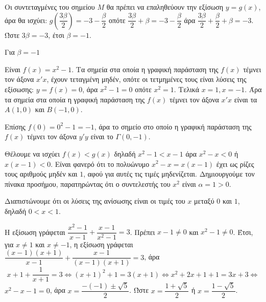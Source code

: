 
\begin{alist}
\item Οι συντεταγμένες του σημείου $M$ θα πρέπει να επαληθεύουν την εξίσωση $y = g(x)$, άρα θα ισχύει:
$g\left(\dfrac{3\beta}{2}\right) = -3 - \dfrac{\beta}{2}$ οπότε $\dfrac{3\beta}{2} + \beta = -3 - \dfrac{\beta}{2}$ άρα $\dfrac{3\beta}{2} + \dfrac{\beta}{2} + \beta = -3$.
Ώστε $3\beta = -3$, έτσι $\beta = -1$.

\item Για $\beta = -1$
\begin{rlist}
\item Είναι $f(x) = x^2 - 1$. Τα σημεία στα οποία η γραφική παράσταση της $f(x)$ τέμνει τον άξονα $x'x$, έχουν τεταγμένη μηδέν, οπότε οι τετμημένες τους είναι λύσεις της εξίσωσης:
$y = f(x) = 0$, άρα $x^2 - 1 = 0$ οπότε $x^2 = 1$. Τελικά $x = 1, x = -1$.
Άρα τα σημεία στα οποία η γραφική παράσταση της $f(x)$ τέμνει τον άξονα $x'x$ είναι τα $A(1, 0)$ και $B(-1, 0)$.

Επίσης $f(0) = 0^2 - 1 = -1$, άρα το σημείο στο οποίο η γραφική παράσταση της $f(x)$ τέμνει τον άξονα $y'y$ είναι το $\Gamma(0, -1)$.

\item Θέλουμε να ισχύει $f(x) < g(x)$ δηλαδή $x^2 - 1 < x - 1$ άρα $x^2 - x < 0$ ή $x(x - 1) < 0$.
Είναι φανερό ότι το πολυώνυμο $x^2 - x = x(x - 1)$ έχει ως ρίζες τους αριθμούς μηδέν και $1$, αφού για αυτές τις τιμές μηδενίζεται. Δημιουργούμε τον πίνακα προσήμου, παρατηρώντας ότι ο συντελεστής του $x^2$ είναι $\alpha = 1 > 0$.

\begin{center}
\end{center}

Διαπιστώνουμε ότι οι λύσεις της ανίσωσης είναι οι τιμές του $x$ μεταξύ $0$ και $1$, δηλαδή $0 < x < 1$.

\item Η εξίσωση γράφεται $\dfrac{x^2 - 1}{x - 1} + \dfrac{x - 1}{x^2 - 1} = 3$. Πρέπει $x - 1 \ne 0$ και $x^2 - 1 \ne 0$.
Έτσι, για $x \ne 1$ και $x \ne -1$, η εξίσωση γράφεται $\dfrac{(x - 1)(x + 1)}{x - 1} + \dfrac{x - 1}{(x - 1)(x + 1)} = 3$, άρα
\[x + 1 + \dfrac{1}{x + 1} = 3 \Leftrightarrow (x + 1)^2 + 1 = 3(x + 1) \Leftrightarrow x^2 + 2x + 1 + 1 = 3x + 3 \Leftrightarrow\]
$x^2 - x - 1 = 0$, άρα $x = \dfrac{-(-1) \pm \sqrt{5}}{2}$.
Ώστε $x = \dfrac{1 + \sqrt{5}}{2}$ ή $x = \dfrac{1 - \sqrt{5}}{2}$.
\end{rlist}
\end{alist}

